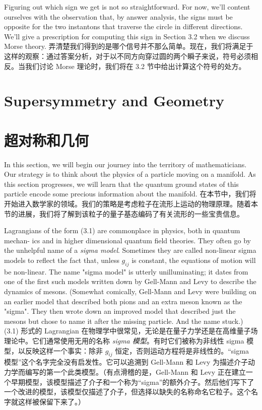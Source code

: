 \documentclass{ctexart}
\begin{document}
\begin{paracol}{2}
Figuring out which sign we get is not so straightforward. For now, we’ll content ourselves with the observation that, by answer analysis, the signs must be opposite for the two instantons that traverse the circle in different directions. We’ll give a prescription for computing this sign in Section 3.2 when we discuss Morse theory.
\switchcolumn
弄清楚我们得到的是哪个信号并不那么简单。现在，我们将满足于这样的观察：通过答案分析，对于以不同方向穿过圆的两个瞬子来说，符号必须相反。当我们讨论 Morse 理论时，我们将在 3.2 节中给出计算这个符号的处方。
\switchcolumn*

\section{Supersymmetry and Geometry}
\switchcolumn
\section*{超对称和几何}
\switchcolumn*

In this section, we will begin our journey into the territory of mathematicians. Our strategy is to think about the physics of a particle moving on a manifold. As this section progresses, we will learn that the quantum ground states of this particle encode some precious information about the manifold.
\switchcolumn
在本节中，我们将开始进入数学家的领域。我们的策略是考虑粒子在流形上运动的物理原理。随着本节的进展，我们将了解到该粒子的量子基态编码了有关流形的一些宝贵信息。
\switchcolumn*

Lagrangians of the form (3.1) are commonplace in physics, both in quantum mechan- ics and in higher dimensional quantum field theories. They often go by the unhelpful name of a \textit{sigma model}. Sometimes they are called non-linear sigma models to reflect the fact that, unless $g_{ij}$ is constant, the equations of motion will be non-linear. The name "sigma model" is utterly unilluminating; it dates from one of the first such models written down by Gell-Mann and Levy to describe the dynamics of mesons. (Somewhat comically, Gell-Mann and Levy were building on an earlier model that described both pions and an extra meson known as the "sigma". They then wrote down an improved model that described just the mesons but chose to name it after the missing particle. And the name stuck.)
\switchcolumn
(3.1) 形式的 Lagrangian 在物理学中很常见，无论是在量子力学还是在高维量子场理论中。它们通常使用无用的名称 \textit{sigma 模型}。有时它们被称为非线性 sigma 模型，以反映这样一个事实：除非 $g_{ij}$ 恒定，否则运动方程将是非线性的。“sigma 模型”这个名字完全没有启发性。它可以追溯到 Gell-Mann 和 Levy 为描述介子动力学而编写的第一个此类模型。（有点滑稽的是，Gell-Mann 和 Levy 正在建立一个早期模型，该模型描述了介子和一个称为“sigma”的额外介子。然后他们写下了一个改进的模型，该模型仅描述了介子，但选择以缺失的名称命名它粒子。这个名字就这样被保留下来了。）
\switchcolumn*


\end{paracol}
\end{document}

